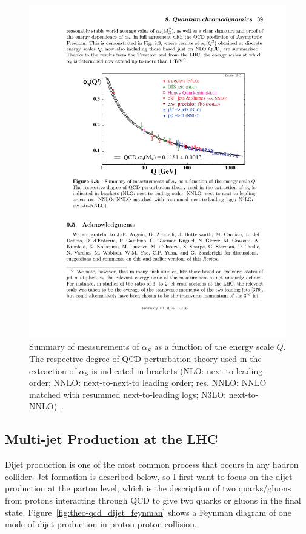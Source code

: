 \begin{figure}[!hbt]
  \begin{center}
    \includegraphics[width=0.7\linewidth, angle=0]{figs/Theory/qcd_running.pdf}
  \end{center}
  \caption[Summary of measurements of $\alpha_S$ as a function of the energy scale $Q$.
    The respective degree of QCD perturbation theory used in the extraction of $\alpha_S$ is indicated in brackets
    (NLO: next-to-leading order; NNLO: next-to-next-to leading order; res. NNLO: NNLO matched with resummed next-to-leading logs; N3LO: next-to-NNLO).]
          {Summary of measurements of $\alpha_S$ as a function of the energy scale $Q$.
            The respective degree of QCD perturbation theory used in the extraction of $\alpha_S$ is indicated in brackets
            (NLO: next-to-leading order; NNLO: next-to-next-to leading order; res. NNLO: NNLO matched with resummed next-to-leading logs; N3LO: next-to-NNLO)~\cite{theo-qcd}.}
  \label{fig:theo-qcd_running}
\end{figure}

\subsection{Multi-jet Production at the LHC}

Dijet production is one of the most common process that occurs in any hadron collider.
Jet formation is described below, so I first want to focus on the dijet production at the parton level;
which is the description of two quarks/gluons from protons interacting through QCD to give
two quarks or gluons in the final state.
Figure~\ref{fig:theo-qcd_dijet_feynman} shows a Feynman diagram of one mode of dijet production in proton-proton collision.

